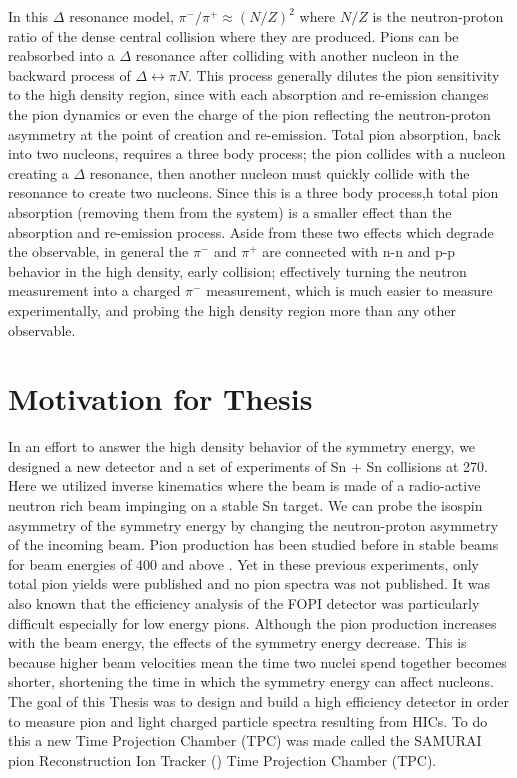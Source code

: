 In this $\Delta$ resonance model, $\pi^-/\pi^+ \approx (N/Z)^2$ where $N/Z$ is the neutron-proton ratio of the dense central collision where they are produced. Pions can be reabsorbed into a $\Delta$ resonance after colliding with another nucleon in the backward process of $\Delta \leftrightarrow \pi N$. This process generally dilutes the pion sensitivity to the high density region, since with each absorption and re-emission changes the pion dynamics or even the charge of the pion reflecting the neutron-proton asymmetry at the point of creation and re-emission. Total pion absorption, back into two nucleons, requires a three body process; the pion collides with a nucleon creating a $\Delta$ resonance, then another nucleon must quickly collide with the resonance to create two nucleons. Since this is a three body process,h total pion absorption (removing them from the system) is a smaller effect than the absorption and re-emission process. Aside from these two effects which degrade the observable, in general the $\pi^-$ and $\pi^+$ are connected with n-n and p-p behavior in the high density, early collision; effectively turning the neutron measurement into a charged $\pi^-$ measurement, which is much easier to measure experimentally, and probing the high density region more than any other observable. 

\section{Motivation for Thesis}
In an effort to answer the high density behavior of the symmetry energy, we designed a new detector and a set of experiments of Sn + Sn collisions at \SI{270}{\MeVA}. Here we utilized inverse kinematics where the beam is made of a radio-active neutron rich beam impinging on a stable Sn target. We can probe the isospin asymmetry of the symmetry energy by changing the neutron-proton asymmetry of the incoming beam. Pion production has been studied before in stable beams for beam energies of \SI{400}{\MeVA} and above \cite{fopi}. Yet in these previous experiments, only total pion yields were published and no pion spectra was not published. It was also known that the efficiency analysis of the FOPI detector was particularly difficult especially for low energy pions. Although the pion production increases with the beam energy, the effects of the symmetry energy decrease. This is because higher beam velocities mean the time two nuclei spend together becomes shorter, shortening the time in which the symmetry energy can affect nucleons.  The goal of this Thesis was to design and build a high efficiency detector in order to measure pion and light charged particle spectra resulting from HICs. To do this a new Time Projection Chamber (TPC) was made called the SAMURAI pion Reconstruction Ion Tracker (\spirit) Time Projection Chamber (TPC).

